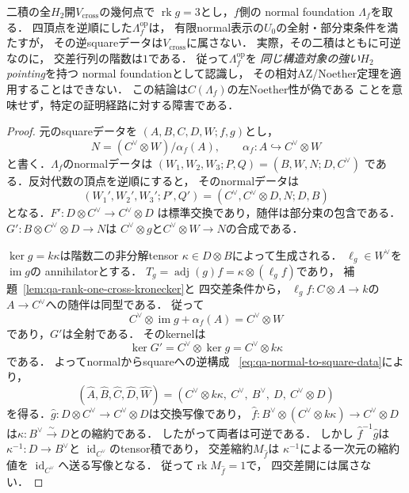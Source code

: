 \begin{proposition}
\label{prop:qa-q12-opposite-normal-rank-three-obstruction}
二積の全$H_2$開$V_{\mathrm{cross}}$の幾何点で
$\operatorname{rk}g=3$とし，$f$側の
normal foundation $\Lambda_f$を取る．
四頂点を逆順にした$\Lambda_f^{\mathrm{op}}$は，
有限normal表示の$U_0$の全射・部分束条件を満たすが，
その逆squareデータは$V_{\mathrm{cross}}$に属さない．
実際，その二積はともに可逆なのに，
交差行列の階数は$1$である．
従って$\Lambda_f^{\mathrm{op}}$を
\emph{同じ構造対象の強い$H_2$ pointing}を持つ
normal foundationとして認識し，
その相対AZ/Noether定理を適用することはできない．
この結論は$C(\Lambda_f)$の左Noether性が偽である
ことを意味せず，特定の証明経路に対する障害である．
\end{proposition}
\begin{proof}
元のsquareデータを
$(A,B,C,D,W;f,g)$とし，
\[
 N=(C^\vee\otimes W)/\alpha_f(A),\qquad
 \alpha_f:A\hookrightarrow C^\vee\otimes W
\]
と書く．$\Lambda_f$のnormalデータは
$(W_1,W_2,W_3;P,Q)=(B,W,N;D,C^\vee)$
である．反対代数の頂点を逆順にすると，
そのnormalデータは
\[
 (W_1',W_2',W_3';P',Q')
 =(C^\vee,C^\vee\otimes D,N;D,B)
\]
となる．$F':D\otimes C^\vee\to C^\vee\otimes D$
は標準交換であり，随伴は部分束の包含である．
$G':B\otimes C^\vee\otimes D\to N$は
$C^\vee\otimes g$と$C^\vee\otimes W\to N$の合成である．

$\ker g=k\kappa$は階数二の非分解tensor
$\kappa\in D\otimes B$によって生成される．
$\ell_g\in W^\vee$を$\operatorname{im}g$の
annihilatorとする．
$T_g=\operatorname{adj}(g)f
=\kappa\otimes(\ell_gf)$であり，
補題~\ref{lem:qa-rank-one-cross-kronecker}と
四交差条件から，
$\ell_gf:C\otimes A\to k$の
$A\to C^\vee$への随伴は同型である．
従って
\[
 C^\vee\otimes\operatorname{im}g+\alpha_f(A)
       =C^\vee\otimes W
\]
であり，$G'$は全射である．
そのkernelは
\[
 \ker G'=C^\vee\otimes\ker g
          =C^\vee\otimes k\kappa
\]
である．
よってnormalからsquareへの逆構成
~\eqref{eq:qa-normal-to-square-data}により，
\[
 (\widehat A,\widehat B,\widehat C,
       \widehat D,\widehat W)
 =(C^\vee\otimes k\kappa,\ C^\vee,\ B^\vee,\
   D,\ C^\vee\otimes D)
\]
を得る．$\widehat g:D\otimes C^\vee\to
C^\vee\otimes D$は交換写像であり，
$\widehat f:B^\vee\otimes
 (C^\vee\otimes k\kappa)\to C^\vee\otimes D$
は$\kappa:B^\vee\xrightarrow{\sim}D$との縮約である．
したがって両者は可逆である．
しかし
$\widehat f^{-1}\widehat g$は
$\kappa^{-1}:D\to B^\vee$と
$\operatorname{id}_{C^\vee}$のtensor積であり，
交差縮約$M_{\widehat f}$は
$\kappa^{-1}$による一次元の縮約値を
$\operatorname{id}_{C^\vee}$へ送る写像となる．
従って$\operatorname{rk}M_{\widehat f}=1$で，
四交差開には属さない．


\end{proof}
